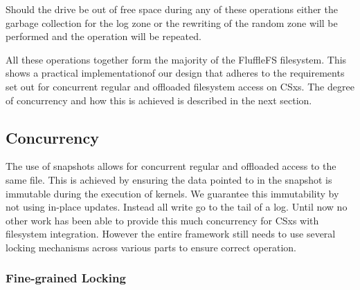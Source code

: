 Should the drive be out of free space during any of these operations either the
garbage collection for the log zone or the rewriting of the random zone will
be performed and the operation will be repeated.

All these operations together form the majority of the FluffleFS filesystem.
This shows a practical implementation\footnotemark[15] of our design that adheres
to the requirements set out for concurrent regular and offloaded filesystem
access on CSxs. The degree of concurrency and how this is achieved is described
in the next section.




\subsection{Concurrency}

The use of snapshots allows for concurrent regular and offloaded access to the
same file. This is achieved by ensuring the data pointed to in the snapshot
is immutable during the execution of kernels. We guarantee this immutability by
not using in-place updates. Instead all write go to the tail of a log. Until now
no other work has been able to provide this much concurrency for CSxs with
filesystem integration. However the entire framework still needs to use several
locking mechanisms across various parts to ensure correct operation.

\subsubsection{Fine-grained Locking}

